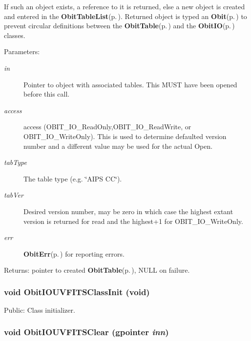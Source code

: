 If such an object exists, a reference to it is returned, else a new object is created and entered in the {\bf Obit\-Table\-List}{\rm (p.\,\pageref{structObitTableList})}. Returned object is typed an {\bf Obit}{\rm (p.\,\pageref{structObit})} to prevent circular definitions between the {\bf Obit\-Table}{\rm (p.\,\pageref{structObitTable})} and the {\bf Obit\-IO}{\rm (p.\,\pageref{structObitIO})} classes. \begin{Desc}
\item[Parameters:]
\begin{description}
\item[{\em in}]Pointer to object with associated tables. This MUST have been opened before this call. \item[{\em access}]access (OBIT\_\-IO\_\-Read\-Only,OBIT\_\-IO\_\-Read\-Write, or OBIT\_\-IO\_\-Write\-Only). This is used to determine defaulted version number and a different value may be used for the actual Open. \item[{\em tab\-Type}]The table type (e.g. \char`\"{}AIPS CC\char`\"{}). \item[{\em tab\-Ver}]Desired version number, may be zero in which case the highest extant version is returned for read and the highest+1 for OBIT\_\-IO\_\-Write\-Only. \item[{\em err}]{\bf Obit\-Err}{\rm (p.\,\pageref{structObitErr})} for reporting errors. \end{description}
\end{Desc}
\begin{Desc}
\item[Returns:]pointer to created {\bf Obit\-Table}{\rm (p.\,\pageref{structObitTable})}, NULL on failure. \end{Desc}
\subsubsection{\setlength{\rightskip}{0pt plus 5cm}void Obit\-IOUVFITSClass\-Init (void)}\label{ObitIOUVFITS_8c_a41}


Public: Class initializer. 

\subsubsection{\setlength{\rightskip}{0pt plus 5cm}void Obit\-IOUVFITSClear (gpointer {\em inn})}\label{ObitIOUVFITS_8c_a4}


